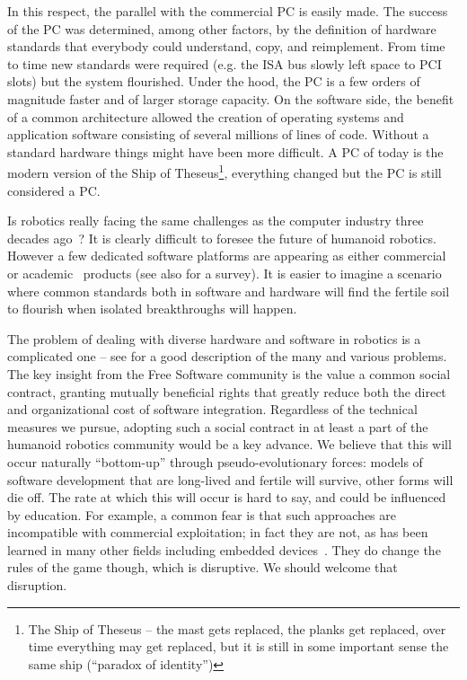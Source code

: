 In this respect, the parallel with the commercial PC is easily made. 
The success of the PC was determined, among other factors, by the definition 
of hardware standards that everybody could understand, copy, and reimplement. 
From time to time new standards were required (e.g. the ISA bus slowly left
space to PCI slots) but the system flourished. Under the hood, the PC is a 
few orders of magnitude faster and of larger
storage capacity. On the software side, the benefit of a common architecture
allowed the creation of operating systems and application software consisting of 
several millions of lines of code. Without a standard hardware things
might have been more difficult.
%
A PC of today is the modern 
version of the Ship of Theseus\footnote{The Ship of 
Theseus -- the mast gets replaced,
the planks get replaced, over time everything may get replaced,
but it is still in some important sense the same ship (``paradox
of identity'')}, everything changed but the PC is still considered
a PC. 
%

Is robotics really facing the same challenges as the computer industry
three decades ago~\cite{gates2007robot}? 
%
It is clearly difficult to foresee the future of humanoid robotics. However
a few dedicated software platforms are appearing as either 
commercial~\cite{microsoft}
or academic~\cite{vaughan2006reusable} products (see also 
\cite{kramer2007development} for a survey). It is
easier %
to imagine a scenario where common standards both in 
software and hardware will find the fertile soil to flourish when 
isolated breakthroughs will happen.
%
%
%

The problem of dealing with diverse hardware and software 
in robotics is a complicated one -- see \cite{nesnas2006claraty} 
for a good description of the many and various problems.
%
The key insight from the Free Software community is the value
a common social contract, granting mutually beneficial rights
that greatly reduce both the direct and organizational cost
of software integration.  Regardless of the technical
measures we pursue, adopting such a social contract
in at least a part of the humanoid robotics community would
be a key advance.
%
We believe that this will occur naturally ``bottom-up''
through pseudo-evolutionary forces: models of software 
development that are long-lived and fertile will survive,
other forms will die off.
%
The rate at which this will occur is hard to say,
and could be influenced by education.
%
For example, a common fear is that such approaches are incompatible
with commercial exploitation; in fact they are not, as has been
learned in many other fields including embedded
devices~\cite{henkel2006selective}.  They do change the rules of the
game though, which is disruptive.
%
We should welcome that disruption.


